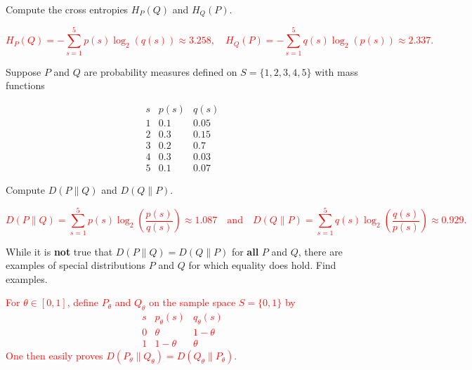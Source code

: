 \documentclass[12pt,reqno]{amsart}
\begin{document}
Compute the cross entropies $H_P( Q)$ and $H_Q( P)$.

\bigskip
\textcolor{red}{
	\[H_P(  Q) = - \sum_{s=1}^5 p(s) \log_2(q(s)) \approx 3.258, \quad H_Q( P) = -\sum_{s=1}^5 q(s) \log_2(p(s)) \approx 2.337.
	\]}
\bigskip








\prob Suppose $P$ and $Q$ are probability measures defined on $S = \{1,2,3,4,5\}$ with mass functions

	\[
	\begin{array}{c|cc}
	s & p(s) & q(s) \\ \hline
	1 & 0.1 & 0.05 \\
	2 & 0.3 & 0.15 \\
	3 & 0.2 & 0.7 \\
	4 & 0.3 & 0.03 \\
	5 & 0.1 & 0.07
	\end{array}
	\]

Compute $D( P \parallel Q)$ and $D(Q\parallel P)$.

\bigskip
\textcolor{red}{
	\[D( P \parallel Q) = \sum_{s=1}^5 p(s) \log_2 \left( \frac{p(s)}{q(s)} \right) \approx 1.087 \quad \text{and} \quad D( Q \parallel P) = \sum_{s=1}^5 q(s) \log_2 \left( \frac{q(s)}{p(s)} \right) \approx 0.929.
	\]}
\bigskip










\prob While it is \textbf{not} true that $D(P\parallel Q) = D(Q \parallel P)$ for \textbf{all} $P$ and $Q$, there are examples of special distributions $P$ and $Q$ for which equality does hold. Find examples.

\bigskip
\textcolor{red}{For $\theta \in [0,1]$, define $P_\theta$ and $Q_\theta$ on the sample space $S= \{0,1\}$ by
	\[\begin{array}{c|cc}
	s & p_\theta(s) & q_\theta(s) \\ \hline
	0 & \theta & 1-\theta \\
	1 & 1 - \theta & \theta
	\end{array}
	\]
One then easily proves $D(P_\theta \parallel Q_\theta) = D(Q_\theta \parallel P_\theta)$.}
\bigskip
\end{document}
